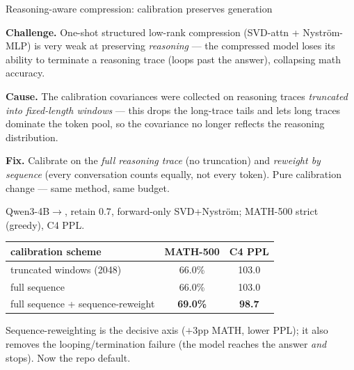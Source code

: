\documentclass[9pt]{beamer}
\begin{document}
	\begin{frame}{Reasoning-aware compression: calibration preserves generation}

		\textbf{Challenge.} One-shot structured low-rank compression (SVD-attn +
		Nystr\"om-MLP) is very weak at preserving \emph{reasoning} --- the
		compressed model loses its ability to terminate a reasoning trace (loops
		past the answer), collapsing math accuracy.

		\vspace{0.4em}
		\textbf{Cause.} The calibration covariances were collected on reasoning
		traces \emph{truncated into fixed-length windows} --- this drops the
		long-trace tails and lets long traces dominate the token pool, so the
		covariance no longer reflects the reasoning distribution.

		\vspace{0.4em}
		\textbf{Fix.} Calibrate on the \emph{full reasoning trace} (no truncation)
		and \emph{reweight by sequence} (every conversation counts equally, not
		every token). Pure calibration change --- same method, same budget.

		\vspace{0.5em}
		{\footnotesize Qwen3-4B$\to$, retain $0.7$, forward-only SVD+Nystr\"om;
		MATH-500 strict (greedy), C4 PPL.}

		\vspace{0.2em}
		{\footnotesize
		\begin{tabular}{@{}lcc@{}}
			\toprule
			calibration scheme & MATH-500 & C4 PPL \\
			\midrule
			truncated windows (2048)            & 66.0\%          & 103.0 \\
			full sequence                       & 66.0\%          & 103.0 \\
			full sequence + sequence-reweight   & \textbf{69.0\%} & \textbf{98.7} \\
			\bottomrule
		\end{tabular}}

		\vspace{0.5em}
		Sequence-reweighting is the decisive axis ($+3$pp MATH, lower PPL); it also
		removes the looping/termination failure (the model reaches the answer
		\emph{and} stops). Now the repo default.

	\end{frame}
\end{document}
